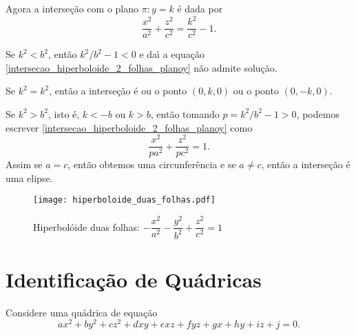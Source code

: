 Agora a interse\c{c}\~ao com o plano $\pi : y = k$ \'e dada por
\begin{equation}\label{intersecao_hiperboloide_2_folhas_planoy}
	\dfrac{x^2}{a^2} + \dfrac{z^2}{c^2} = \dfrac{k^2}{c^2} - 1.	
\end{equation}

Se $k^2 < b^2$, ent\~ao $k^2/b^2 - 1 < 0$ e da{\'\i} a equa\c{c}\~ao \eqref{intersecao_hiperboloide_2_folhas_planoy} n\~ao admite solu\c{c}\~ao.

Se $k^2 = k^2$, ent\~ao a interse\c{c}\~ao \'e ou o ponto $(0,k,0)$ ou o ponto $(0,-k,0)$.

Se $k^2 > b^2$, isto \'e, $k < -b$ ou $k > b$, ent\~ao tomando $p = k^2/b^2 - 1 > 0$, podemos escrever \eqref{intersecao_hiperboloide_2_folhas_planoy} como
\[
	\dfrac{x^2}{pa^2} + \dfrac{z^2}{pc^2} = 1.
\]
Assim se $a = c$, ent\~ao obtemos uma circunfer\^encia e se $a \ne c$, ent\~ao a interse\c{c}\~ao \'e uma elipse.

\begin{figure}[h]
	\centering
	\caption{Hiperbol\'oide duas folhas: $-\dfrac{x^2}{a^2} - \dfrac{y^2}{b^2} + \dfrac{z^2}{c^2} = 1$}
	\texttt{[image: hiperboloide\_duas\_folhas.pdf]}
\end{figure}



	



\section{Identifica\c{c}\~ao de Qu\'adricas} %
\label{sec:identificacao_de_quadricas}

Considere uma qu\'adrica de equa\c{c}\~ao
\begin{equation}\label{equacao_geral_quadrica}
  ax^2 + by^2 + cz^2 + dxy + exz + fyz + gx + hy + iz + j = 0.
\end{equation}

